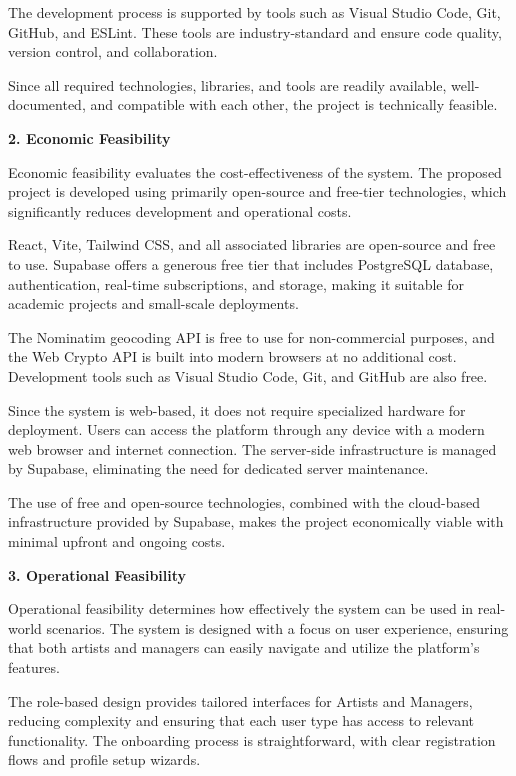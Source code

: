 \documentclass[12pt,a4paper]{report}
\begin{document}
The development process is supported by tools such as Visual Studio Code, Git, GitHub, and ESLint. These tools are industry-standard and ensure code quality, version control, and collaboration.

Since all required technologies, libraries, and tools are readily available, well-documented, and compatible with each other, the project is technically feasible.

\textbf{2. Economic Feasibility}

Economic feasibility evaluates the cost-effectiveness of the system. The proposed project is developed using primarily open-source and free-tier technologies, which significantly reduces development and operational costs.

React, Vite, Tailwind CSS, and all associated libraries are open-source and free to use. Supabase offers a generous free tier that includes PostgreSQL database, authentication, real-time subscriptions, and storage, making it suitable for academic projects and small-scale deployments.

The Nominatim geocoding API is free to use for non-commercial purposes, and the Web Crypto API is built into modern browsers at no additional cost. Development tools such as Visual Studio Code, Git, and GitHub are also free.

Since the system is web-based, it does not require specialized hardware for deployment. Users can access the platform through any device with a modern web browser and internet connection. The server-side infrastructure is managed by Supabase, eliminating the need for dedicated server maintenance.

The use of free and open-source technologies, combined with the cloud-based infrastructure provided by Supabase, makes the project economically viable with minimal upfront and ongoing costs.

\textbf{3. Operational Feasibility}

Operational feasibility determines how effectively the system can be used in real-world scenarios. The system is designed with a focus on user experience, ensuring that both artists and managers can easily navigate and utilize the platform's features.

The role-based design provides tailored interfaces for Artists and Managers, reducing complexity and ensuring that each user type has access to relevant functionality. The onboarding process is straightforward, with clear registration flows and profile setup wizards.
\end{document}
